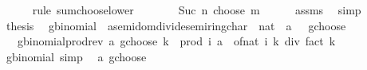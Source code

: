 \begin{isabellebody}
\ \ \ \ \isamarkupfalse%
\ {\isacharparenleft}{\kern0pt}rule\ sum{\isacharunderscore}{\kern0pt}choose{\isacharunderscore}{\kern0pt}lower{\isacharparenright}{\kern0pt}\isanewline
\ \ \isamarkupfalse%
\ \isamarkupfalse%
\ {\isachardoublequoteopen}{\isasymdots}\ {\isacharequal}{\kern0pt}\ Suc\ n\ choose\ m{\isachardoublequoteclose}\isanewline
\ \ \ \ \isamarkupfalse%
\ assms\ \isamarkupfalse%
\ simp\isanewline
\ \ \isamarkupfalse%
\ \isamarkupfalse%
\ {\isacharquery}{\kern0pt}thesis\ \isacommand{{\isachardot}{\kern0pt}}\isamarkupfalse%
\isanewline
{}\isamarkupfalse%
%
\endisatagproof
{\isafoldproof}%
%
\isadelimproof
%
\endisadelimproof
%
\isadelimdocument
%
\endisadelimdocument
%
\isatagdocument
%
\isamarkuptrue%
%
\endisatagdocument
{\isafolddocument}%
%
\isadelimdocument
%
\endisadelimdocument
{}\isamarkupfalse%
\ gbinomial\ {\isacharcolon}{\kern0pt}{\isacharcolon}{\kern0pt}\ {\isachardoublequoteopen}{\isacharprime}{\kern0pt}a{\isacharcolon}{\kern0pt}{\isacharcolon}{\kern0pt}{\isacharbraceleft}{\kern0pt}semidom{\isacharunderscore}{\kern0pt}divide{\isacharcomma}{\kern0pt}semiring{\isacharunderscore}{\kern0pt}char{\isacharunderscore}{\kern0pt}{}{\isacharbraceright}{\kern0pt}\ {\isasymRightarrow}\ nat\ {\isasymRightarrow}\ {\isacharprime}{\kern0pt}a{\isachardoublequoteclose}\ \ {\isacharparenleft}{\kern0pt}\ {\isachardoublequoteopen}gchoose{\isachardoublequoteclose}\ {}{}{\isacharparenright}{\kern0pt}\isanewline
\ \ \ gbinomial{\isacharunderscore}{\kern0pt}prod{\isacharunderscore}{\kern0pt}rev{\isacharcolon}{\kern0pt}\ {\isachardoublequoteopen}a\ gchoose\ k\ {\isacharequal}{\kern0pt}\ prod\ {\isacharparenleft}{\kern0pt}{\isasymlambda}i{\isachardot}{\kern0pt}\ a\ {\isacharminus}{\kern0pt}\ of{\isacharunderscore}{\kern0pt}nat\ i{\isacharparenright}{\kern0pt}\ {\isacharbraceleft}{\kern0pt}{}{\isachardot}{\kern0pt}{\isachardot}{\kern0pt}{\isacharless}{\kern0pt}k{\isacharbraceright}{\kern0pt}\ div\ fact\ k{\isachardoublequoteclose}\isanewline
\isanewline
{}\isamarkupfalse%
\ gbinomial{\isacharunderscore}{\kern0pt}{}\ {\isacharbrackleft}{\kern0pt}simp{\isacharbrackright}{\kern0pt}{\isacharcolon}{\kern0pt}\isanewline
\ \ {\isachardoublequoteopen}a\ gchoose\ {}\ {\isacharequal}{\kern0pt}\ {}{\isachardoublequoteclose}\isanewline

\end{isabellebody}
